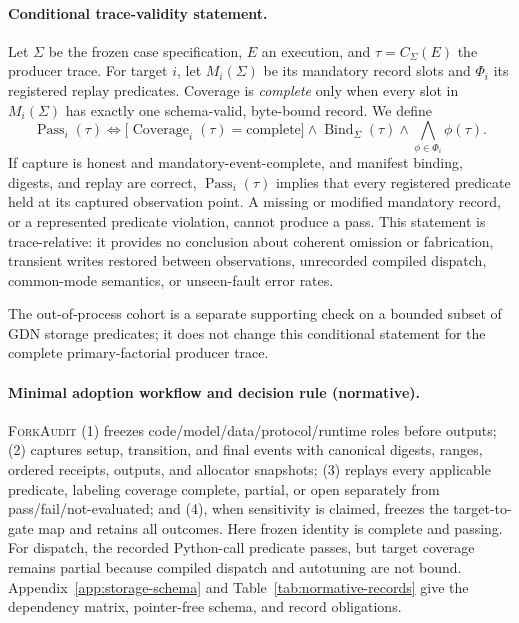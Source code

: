 \documentclass{article}
\newcommand{\method}{\textsc{ForkAudit}}
\begin{document}
\paragraph{Conditional trace-validity statement.}
Let $\Sigma$ be the frozen case specification, $E$ an execution, and
$\tau=C_{\Sigma}(E)$ the producer trace.  For target $i$, let
$M_i(\Sigma)$ be its mandatory record slots and $\Phi_i$ its registered replay
predicates.  Coverage is \emph{complete} only when every slot in
$M_i(\Sigma)$ has exactly one schema-valid, byte-bound record.  We define
\begin{equation}
  \operatorname{Pass}_i(\tau) \Longleftrightarrow
  \bigl[\operatorname{Coverage}_i(\tau)=\mathrm{complete}\bigr]
  \wedge \operatorname{Bind}_{\Sigma}(\tau)
  \wedge \bigwedge_{\phi\in\Phi_i}\phi(\tau).
\end{equation}
If capture is honest and mandatory-event-complete, and manifest binding,
digests, and replay are correct, $\operatorname{Pass}_i(\tau)$ implies that
every registered predicate held at its captured observation point.  A missing
or modified mandatory record, or a represented predicate violation, cannot
produce a pass.  This statement is trace-relative: it provides no conclusion
about coherent omission or fabrication, transient writes restored between
observations, unrecorded compiled dispatch, common-mode semantics, or
unseen-fault error rates.

The out-of-process cohort is a separate supporting check on a bounded subset
of GDN storage predicates; it does not change this conditional statement for
the complete primary-factorial producer trace.

\paragraph{Minimal adoption workflow and decision rule (normative).}
\method{} (1) freezes code/model/data/protocol/runtime roles before outputs;
(2) captures setup, transition, and final events with canonical digests,
ranges, ordered receipts, outputs, and allocator snapshots; (3) replays every
applicable predicate, labeling coverage complete, partial, or open separately
from pass/fail/not-evaluated; and (4), when sensitivity is claimed, freezes the
target-to-gate map and retains all outcomes.  Here frozen identity is complete
and passing.  For dispatch, the recorded Python-call predicate passes, but
target coverage remains partial because compiled dispatch and autotuning are
not bound.
Appendix~\ref{app:storage-schema} and Table~\ref{tab:normative-records} give the
dependency matrix, pointer-free schema, and record obligations.
\end{document}
